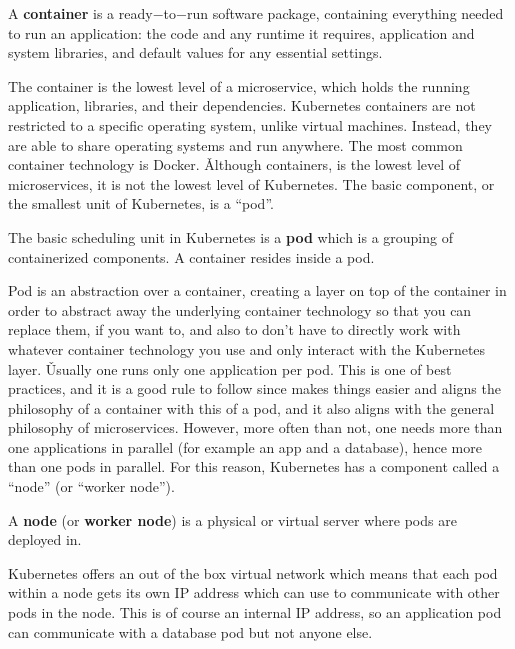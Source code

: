 \bd[Container]
A \textbf{container} is a ready$-$to$-$run software package, containing everything needed to run an application: the
code and any runtime it requires, application and system libraries, and default values for any essential settings.
\ed


The container is the lowest level of a microservice, which holds the running application, libraries, and their
dependencies. Kubernetes containers are not restricted to a specific operating system, unlike virtual machines.
Instead, they are able to share operating systems and run anywhere. The most common container technology is Docker. \v

Although containers, is the lowest level of microservices, it is not the lowest level of Kubernetes. The basic
component, or the smallest unit of Kubernetes, is a ``pod''.

\bd[Pod]
The basic scheduling unit in Kubernetes is a \textbf{pod} which is a grouping of containerized components. A container
resides inside a pod.
\ed


Pod is an abstraction over a container, creating a layer on top of the container in order to abstract away the
underlying container technology so that you can replace them, if you want to, and also to don't have to directly work
with whatever container technology you use and only interact with the Kubernetes layer. \v

Usually one runs only one application per pod. This is one of best practices, and it is a good rule to follow since
makes things easier and aligns the philosophy of a container with this of a pod, and it also aligns with the general
philosophy of microservices. However, more often than not, one needs more than one applications in parallel (for
example an app and a database), hence more than one pods in parallel. For this reason, Kubernetes has a component
called a ``node'' (or ``worker node'').

A \textbf{node} (or \textbf{worker node}) is a physical or virtual server where pods are deployed in.
\ed


Kubernetes offers an out of the box virtual network which means that each pod within a node gets its own IP address
which can use to communicate with other pods in the node. This is of course an internal IP address, so an application
pod can communicate with a database pod but not anyone else.

